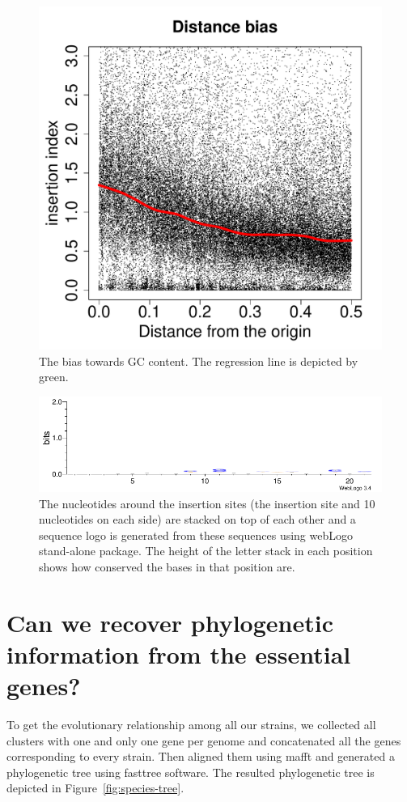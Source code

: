 \documentclass[a4paper,10pt, twocolumn]{article}
\begin{document}
\begin{figure}
\includegraphics[scale=0.28, page=15]{biases.pdf}
\caption{The bias towards GC content. The regression line is depicted by green.}
\label{fig:GC_bias}
\end{figure}

\begin{figure}
\includegraphics[scale=.98, angle = -90]{logo.pdf}
\caption{The nucleotides around the insertion sites (the insertion site and 10 nucleotides on each side) are stacked on top of each other and a sequence logo is generated from these sequences using webLogo stand-alone package. The height of the letter stack in each position shows how conserved the bases in that position are.}
\label{fig:logo}
\end{figure}

\section{Can we recover phylogenetic information from the essential genes?}
To get the evolutionary relationship among all our strains, we collected all clusters with one and only one gene per genome and concatenated all the genes corresponding to every strain. Then aligned them using mafft and generated a phylogenetic tree using fasttree software. The resulted phylogenetic tree is depicted in Figure~\ref{fig:species-tree}.
\end{document}
